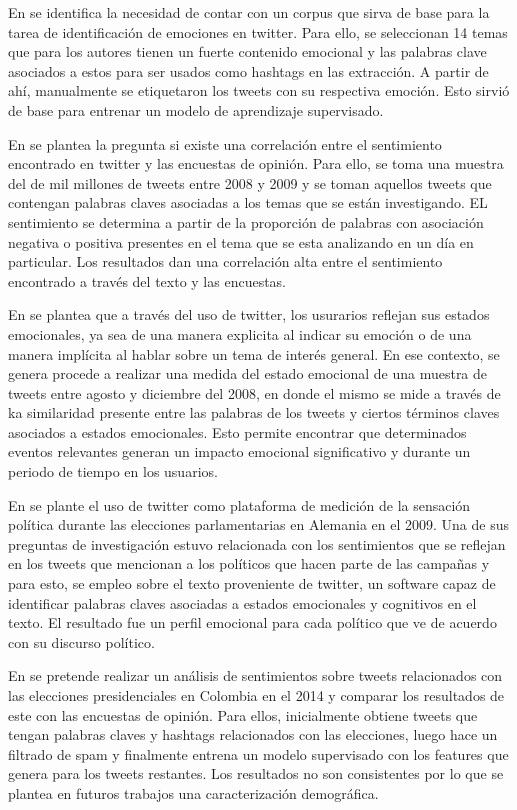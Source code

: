 En \cite{roberts2012empatweet} se identifica la necesidad de contar con un corpus que sirva de base para la tarea de identificación de emociones en twitter. Para ello, se seleccionan  14 temas que para los autores tienen un fuerte contenido emocional y las palabras clave asociados a estos para ser usados como hashtags en las extracción. A partir de ahí, manualmente se etiquetaron los tweets con su respectiva emoción. Esto sirvió de base para entrenar un modelo de aprendizaje supervisado.


En \cite{o2010tweets} se plantea la pregunta si existe una correlación entre el sentimiento encontrado en twitter y las encuestas de opinión. Para ello, se toma una muestra del de mil millones de tweets entre 2008 y 2009 y se toman aquellos tweets que contengan palabras claves asociadas a los temas que se están investigando. EL sentimiento se determina a partir de la proporción de palabras con asociación negativa o positiva presentes en el tema que se esta analizando en un día en particular. Los resultados dan una correlación alta entre el sentimiento encontrado a través del texto y las encuestas.


En \cite{bollen2011modeling} se plantea que a través del uso de twitter, los usurarios reflejan sus estados emocionales, ya sea de una manera explicita al indicar su emoción o de una manera implícita al hablar sobre un tema de interés general. En ese contexto, se genera procede a realizar una medida del estado emocional de una muestra de tweets entre agosto y diciembre del 2008, en donde el mismo se mide a través de ka similaridad presente entre las palabras de los tweets y ciertos términos claves asociados a estados emocionales. Esto permite encontrar que determinados eventos relevantes generan un impacto emocional significativo y durante un periodo de tiempo en los usuarios.

En \cite{tumasjan2010predicting} se plante el uso de twitter como plataforma de medición de la sensación política durante las elecciones parlamentarias en Alemania en el 2009. Una de sus preguntas de investigación estuvo relacionada con los sentimientos que se reflejan en los tweets que mencionan a los políticos que hacen parte de las campañas y para esto, se empleo sobre el texto proveniente de twitter, un software capaz de identificar palabras claves asociadas a estados emocionales y cognitivos en el texto. El resultado fue un perfil emocional para cada político que ve de acuerdo con su discurso político.

En \cite{ceron2016sentiment} se pretende realizar un análisis de sentimientos sobre tweets relacionados con las elecciones presidenciales en Colombia en el 2014 y comparar los resultados de este con las encuestas de opinión. Para ellos, inicialmente obtiene tweets que tengan  palabras claves y hashtags relacionados con las elecciones, luego hace un filtrado de spam y finalmente entrena un modelo supervisado con los features que genera para los tweets restantes. Los resultados no son consistentes por lo que se plantea en futuros trabajos  una caracterización demográfica.

